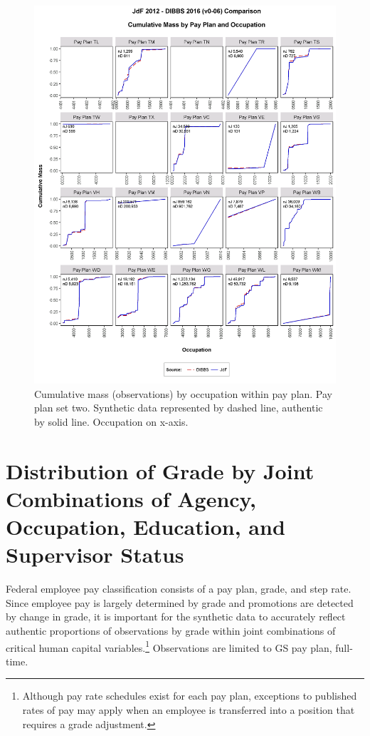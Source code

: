 \documentclass[10pt, letterpaper]{article}
\begin{document}
\begin{spacing}{1.0}
\begin{figure}[]
    \centering
    \includegraphics[width=5.85in, trim={0 0.75in 0 0.75in}, clip]{CMFOccupationPayPlan141.png}
    \caption{Cumulative mass (observations) by occupation within pay plan.  Pay plan set two. Synthetic data represented by dashed line, authentic by solid line.  Occupation on x-axis.}
    \label{figure:CMFOccupationPayPlan2}
\end{figure}

\clearpage

\section{Distribution of Grade by Joint Combinations of Agency, Occupation, Education, and Supervisor Status}

Federal employee pay classification consists of a pay plan, grade, and step rate.  Since employee pay is largely determined by grade and promotions are detected by change in grade, it is important for the synthetic data to accurately reflect authentic proportions of observations by grade within joint combinations of critical human capital variables.\footnote{Although pay rate schedules exist for each pay plan, exceptions to published rates of pay may apply when an employee is transferred into a position that requires a grade adjustment.}  Observations are limited to GS pay plan, full-time.\\


\end{spacing}
\end{document}
